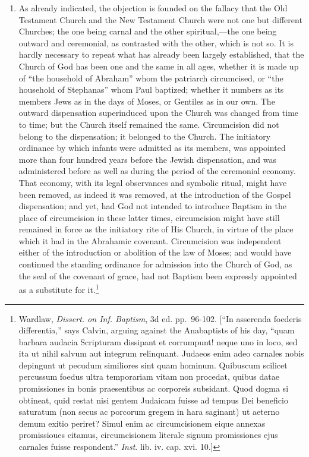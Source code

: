 \documentclass[english,]{book}
\providecommand{\tightlist}{%
  \setlength{\itemsep}{0pt}\setlength{\parskip}{0pt}}
\begin{document}
\begin{enumerate}
\def\labelenumi{\arabic{enumi}.}
\tightlist
\item
  As already indicated, the objection is founded on the fallacy that the Old Testament Church and the New Testament Church were not one but different Churches; the one being carnal and the other spiritual,---the one being outward and ceremonial, as contrasted with the other, which is not so. It is hardly necessary to repeat what has already been largely established, that the Church of God has been one and the same in all ages, whether it is made up of ``the household of Abraham'' whom the patriarch circumcised, or ``the household of Stephanas'' whom Paul baptized; whether it numbers as its members Jews as in the days of Moses, or Gentiles as in our own. The outward dispensation superinduced upon the Church was changed from time to time; but the Church itself remained the same. Circumcision did not belong to the dispensation; it belonged to the Church. The initiatory ordinance by which infants were admitted as its members, was appointed more than four hundred years before the Jewish dispensation, and was administered before as well as during the period of the ceremonial economy. That economy, with its legal observances and symbolic ritual, might have been removed, as indeed it was removed, at the introduction of the Gospel dispensation; and yet, had God not intended to introduce Baptism in the place of circumcision in these latter times, circumcision might have still remained in force as the initiatory rite of His Church, in virtue of the place which it had in the Abrahamic covenant. Circumcision was independent either of the introduction or abolition of the law of Moses; and would have continued the standing ordinance for admission into the Church of God, as the seal of the covenant of grace, had not Baptism been expressly appointed as a substitute for it.\footnote{Wardlaw, \emph{Dissert. on Inf. Baptism}, 3d ed. pp.~96-102. {[}``In asserenda foederis differentia,'' says Calvin, arguing against the Anabaptists of his day, ``quam barbara audacia Scripturam dissipant et corrumpunt! neque uno in loco, sed ita ut nihil salvum aut integrum relinquant. Judaeos enim adeo carnales nobis depingunt ut pecudum similiores sint quam hominum. Quibuscum scilicet percussum foedus ultra temporariam vitam non procedat, quibus datae promissiones in bonis praesentibus ac corporeis subsidant. Quod dogma si obtineat, quid restat nisi gentem Judaicam fuisse ad tempus Dei beneficio saturatum (non secus ac porcorum gregem in hara saginant) ut aeterno demum exitio periret? Simul enim ac circumcisionem eique annexas promissioues citamus, circumcisionem literale signum promissiones ejus carnales fuisse respondent.'' \emph{Inst}. lib. iv. cap. xvi. 10.{]}}
\end{enumerate}
\end{document}

